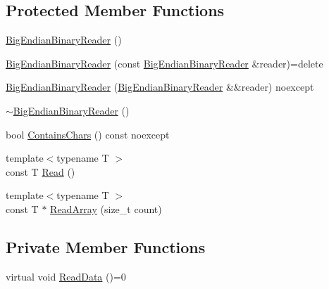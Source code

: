 \subsection*{Protected Member Functions}
\begin{DoxyCompactItemize}
\item 
\mbox{\hyperlink{classmage_1_1_big_endian_binary_reader_a1fd0dbee6950a8cb04aa399f0cdbaf2a}{Big\+Endian\+Binary\+Reader}} ()
\item 
\mbox{\hyperlink{classmage_1_1_big_endian_binary_reader_a9d490263268290217ae4f2f06e0699c4}{Big\+Endian\+Binary\+Reader}} (const \mbox{\hyperlink{classmage_1_1_big_endian_binary_reader}{Big\+Endian\+Binary\+Reader}} \&reader)=delete
\item 
\mbox{\hyperlink{classmage_1_1_big_endian_binary_reader_a16c4303dfb333ebdddfc07c924b9735a}{Big\+Endian\+Binary\+Reader}} (\mbox{\hyperlink{classmage_1_1_big_endian_binary_reader}{Big\+Endian\+Binary\+Reader}} \&\&reader) noexcept
\item 
\mbox{\hyperlink{classmage_1_1_big_endian_binary_reader_ae85a40e8ed06e8c887e38d914843b8d3}{$\sim$\+Big\+Endian\+Binary\+Reader}} ()
\item 
bool \mbox{\hyperlink{classmage_1_1_big_endian_binary_reader_ac6de015b6bbcecdcef58ab074d99fb49}{Contains\+Chars}} () const noexcept
\item 
{\footnotesize template$<$typename T $>$ }\\const T \mbox{\hyperlink{classmage_1_1_big_endian_binary_reader_ac5dca9fec95723379d44e112946a352a}{Read}} ()
\item 
{\footnotesize template$<$typename T $>$ }\\const T $\ast$ \mbox{\hyperlink{classmage_1_1_big_endian_binary_reader_aaab7cf04eb19cc0fe535b9a619feaf21}{Read\+Array}} (size\+\_\+t count)
\end{DoxyCompactItemize}
\subsection*{Private Member Functions}
\begin{DoxyCompactItemize}
\item 
virtual void \mbox{\hyperlink{classmage_1_1_big_endian_binary_reader_a7dc0689d598fa91308597b129516a11d}{Read\+Data}} ()=0
\end{DoxyCompactItemize}

